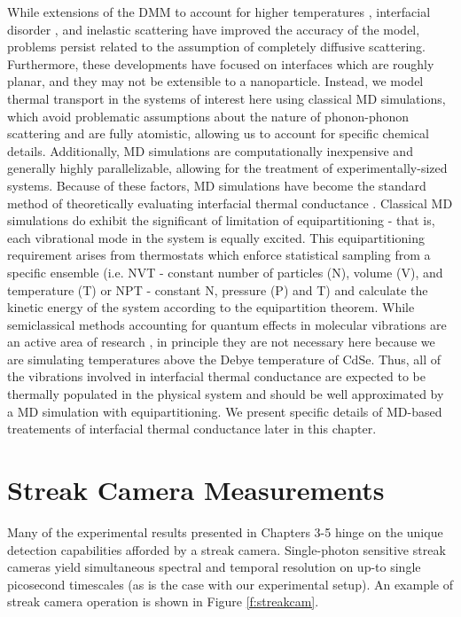 While extensions of the DMM to account for higher temperatures \cite{duda2009extension}, interfacial disorder \cite{beechem2007role}, and inelastic scattering \cite{hopkins2007effects} have improved the accuracy of the model, problems persist related to the assumption of completely diffusive scattering. Furthermore, these developments have focused on interfaces which are roughly planar, and they may not be extensible to a nanoparticle. Instead, we model thermal transport in the systems of interest here using classical MD simulations, which avoid problematic assumptions about the nature of phonon-phonon scattering and are fully atomistic, allowing us to account for specific chemical details. Additionally, MD simulations are computationally inexpensive and generally highly parallelizable, allowing for the treatment of experimentally-sized systems. Because of these factors, MD simulations have become the standard method of theoretically evaluating interfacial thermal conductance \cite{cahill2003nanoscale, yang2015thermal, cahill2014nanoscale}. Classical MD simulations do exhibit the significant of limitation of equipartitioning - that is, each vibrational mode in the system is equally excited. This equipartitioning requirement arises from thermostats which enforce statistical sampling from a specific ensemble (i.e. NVT - constant number of particles (N), volume (V), and temperature (T) or NPT - constant N, pressure (P) and T) and calculate the kinetic energy of the system according to the equipartition theorem. While semiclassical methods accounting for quantum effects in molecular vibrations are an active area of research \cite{PhysRevB.79.224305, PhysRevB.86.064305}, in principle they are not necessary here because we are simulating temperatures above the Debye temperature of CdSe. Thus, all of the vibrations involved in interfacial thermal conductance are expected to be thermally populated in the physical system and should be well approximated by a MD simulation with equipartitioning. We present specific details of MD-based treatements of interfacial thermal conductance later in this chapter. 

\section{Streak Camera Measurements}

Many of the experimental results presented in Chapters 3-5 hinge on the unique detection capabilities afforded by a streak camera. Single-photon sensitive streak cameras yield simultaneous spectral and temporal resolution on up-to single picosecond timescales (as is the case with our experimental setup). An example of streak camera operation is shown in Figure \ref{f:streakcam}. \par

